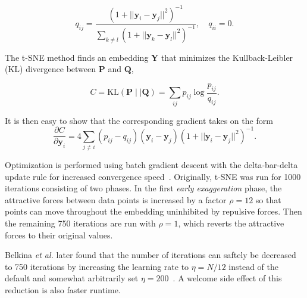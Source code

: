\documentclass[twocolumn]{bmcart}
\begin{document}
\begin{equation}
q_{ij} = \frac{\left ( 1 + || \mathbf{y}_i - \mathbf{y}_j ||^2 \right )^{-1}}
{\sum_{k \neq l}\left ( 1 + || \mathbf{y}_k - \mathbf{y}_l ||^2 \right )^{-1}},
\quad q_{ii} = 0.
\label{eq:cauchy_kernel}
\end{equation}

The t-SNE method finds an embedding $\mathbf{Y}$ that minimizes the
Kullback-Leibler (KL) divergence between $\mathbf{P}$ and $\mathbf{Q}$,

\begin{equation}
C = \text{KL}(\mathbf{P} \mid \mid \mathbf{Q}) = \sum_{ij} p_{ij} \log \frac{p_{ij}}{q_{ij}}.
\label{eq:kl_divergence}
\end{equation}

It is then easy to show that the corresponding gradient takes on the form
\begin{equation}
\frac{\partial C}{\partial \mathbf{y}_i} = 4 \sum_{j \neq i} \left ( p_{ij} - q_{ij} \right ) \left ( \mathbf{y}_i - \mathbf{y}_j \right ) \left ( 1 + || \mathbf{y}_i - \mathbf{y}_j || ^2 \right )^{-1}.
\label{eq:tsne_gradient}
\end{equation}

Optimization is performed using batch gradient descent with the delta-bar-delta update rule for increased convergence speed~\cite{jacobs1988increased}. Originally, t-SNE was run for 1000 iterations consisting of two phases. In the first \textit{early exaggeration} phase, the attractive forces between data points is increased by a factor $\rho=12$ so that points can move throughout the embedding uninhibited by repulsive forces. Then the remaining 750 iterations are run with $\rho=1$, which reverts the attractive forces to their original values.

Belkina \textit{et al.} later found that the number of iterations can saftely be decreased to 750 iterations by increasing the learning rate to $\eta=N/12$ instead of the default and somewhat arbitrarily set $\eta=200$~\cite{belkina2019automated}. A welcome side effect of this reduction is also faster runtime.
\end{document}
